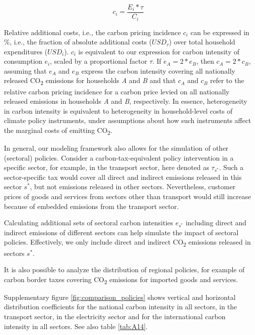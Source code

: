 \documentclass[12pt, a4paper]{article}
\begin{document}
\begin{refsection}
\begin{equation}
    c_{i} = \frac{E_{i}*\tau}{C_{i}}
\end{equation}

Relative additional costs, i.e., the carbon pricing incidence $c_{i}$ can be expressed in \%, i.e., the fraction of absolute additional costs ($USD_{\tau}$) over total household expenditures ($USD_{i}$). $c_{i}$ is equivalent to our expression for carbon intensity of consumption $e_{i}$, scaled by a proportional factor $\tau$. If $e_{A}=2*e_{B}$, then $c_{A}=2*c_{B}$, assuming that $e_{A}$ and $e_{B}$ express the carbon intensity covering all nationally released CO\textsubscript{2} emissions for households \textit{A} and \textit{B} and that $c_{A}$ and $c_{B}$ refer to the relative carbon pricing incidence for a carbon price levied on all nationally released emissions in households \textit{A} and \textit{B}, respectively. In essence, heterogeneity in carbon intensity is equivalent to heterogeneity in household-level costs of climate policy instruments, under assumptions about how such instruments affect the marginal costs of emitting CO\textsubscript{2}.

In general, our modeling framework also allows for the simulation of other (sectoral) policies. Consider a carbon-tax-equivalent policy intervention in a specific sector, for example, in the transport sector, here denoted as $\tau_{s^{*}}$. Such a sector-specific tax would cover all direct and indirect emissions released in this sector $s^{*}$, but not emissions released in other sectors. Nevertheless, customer prices of goods and services from sectors other than transport would still increase because of embedded emissions from the transport sector.

Calculating additional sets of sectoral carbon intensities $e_{s^{*}}$ including direct and indirect emissions of different sectors can help simulate the impact of sectoral policies. Effectively, we only include direct and indirect CO\textsubscript{2} emissions released in sectors $s^{*}$.

It is also possible to analyze the distribution of regional policies, for example of carbon border taxes covering CO\textsubscript{2} emissions for imported goods and services. 

Supplementary figure \ref{fig:comparison_policies} shows vertical and horizontal distribution coefficients for the national carbon intensity in all sectors, in the transport sector, in the electricity sector and for the international carbon intensity in all sectors. See also table \ref{tab:A14}.


\end{refsection}
\end{document}
